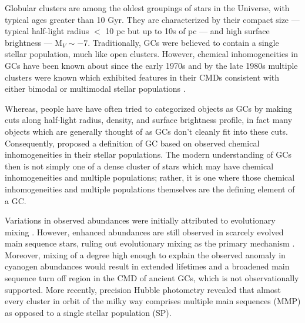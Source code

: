 Globular clusters \citep[GC,][]{Herschel1814} are among the oldest groupings of
stars in the Universe, with typical ages greater than 10 Gyr. They are
characterized by their compact size --- typical half-light radius $<$ 10 pc but
up to 10s of pc --- and high surface brightness --- M$_{V} \sim -7$.
Traditionally, GCs were believed to contain a single stellar population, much
like open clusters. However, chemical inhomogeneities in GCs have been known
about since the early 1970s \citep[e.g.][]{Osborn1971} and by the late 1980s
multiple clusters were known which exhibited features in their CMDs consistent
with either bimodal or multimodal stellar populations
\citep[e.g.][]{Norris1987}.

Whereas, people have have often tried to categorized objects as GCs by making
cuts along half-light radius, density, and surface brightness profile, in fact
many objects which are generally thought of as GCs don't cleanly fit into these
cuts. Consequently, \citet{Carretta2010} proposed a definition of GC based on
observed chemical inhomogeneities in their stellar populations. The modern
understanding of GCs then is not simply one of a dense cluster of stars which
may have chemical inhomogeneities and multiple populations; rather, it is one
where those chemical inhomogeneities and multiple populations themselves are
the defining element of a GC.

Variations in observed abundances were initially attributed to evolutionary
mixing \citep{Denisenkov1990}. However, enhanced abundances are still observed
in scarcely evolved main sequence stars, ruling out evolutionary mixing as the
primary mechanism \citep{Gratton2004,Briley2004}. Moreover, mixing of a degree
high enough to explain the observed anomaly in cyanogen abundances would result
in extended lifetimes and a broadened main sequence turn off region in the CMD
of ancient GCs, which is not observationally supported. More recently,
precision Hubble photometry revealed that almost every cluster in orbit of the
milky way comprises multiple main sequences \citep{Piotto2007, Roh2011,
Milone2012} (MMP) as opposed to a single stellar population (SP).

